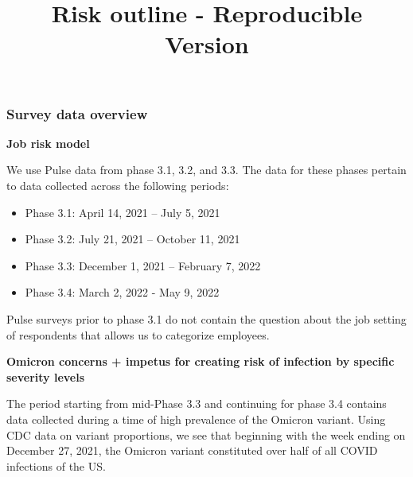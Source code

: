 \documentclass[
]{article}
\title{Risk outline - Reproducible Version}
\author{}
\date{\vspace{-2.5em}}
\providecommand{\tightlist}{%
  \setlength{\itemsep}{0pt}\setlength{\parskip}{0pt}}
\begin{document}
\maketitle

\hypertarget{survey-data-overview}{%
\subsubsection{Survey data overview}\label{survey-data-overview}}

\textbf{Job risk model}

We use Pulse data from phase 3.1, 3.2, and 3.3. The data for these
phases pertain to data collected across the following periods:

\begin{itemize}
\tightlist
\item
  Phase 3.1: April 14, 2021 -- July 5, 2021
\item
  Phase 3.2: July 21, 2021 -- October 11, 2021
\item
  Phase 3.3: December 1, 2021 -- February 7, 2022
\item
  Phase 3.4: March 2, 2022 - May 9, 2022
\end{itemize}

Pulse surveys prior to phase 3.1 do not contain the question about the
job setting of respondents that allows us to categorize employees.

\textbf{Omicron concerns + impetus for creating risk of infection by
specific severity levels}

The period starting from mid-Phase 3.3 and continuing for phase 3.4
contains data collected during a time of high prevalence of the Omicron
variant. Using CDC data on variant proportions, we see that beginning
with the week ending on December 27, 2021, the Omicron variant
constituted over half of all COVID infections of the US.
\end{document}

